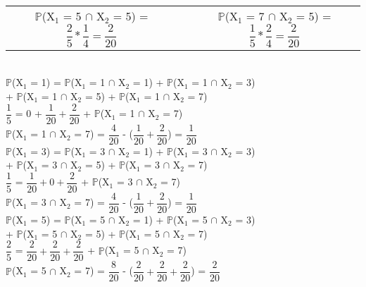 \documentclass[12pt,a4paper,draft,final,oneside]{article}
\begin{document}
\begin{center}
\begin{tabular}{ccc}
			$\mathbb{P}$(X$_{1}$ = 5 $\cap$ X$_{2}$ = 5) = $\dfrac{2}{5}*\dfrac{1}{4} = \dfrac{2}{20}$ & &
			$\mathbb{P}$(X$_{1}$ = 7 $\cap$ X$_{2}$ = 5) = $\dfrac{1}{5}*\dfrac{2}{4} = \dfrac{2}{20}$ \vspace{0.5cm}\\	
		\end{tabular}
		\vspace{1cm}\\
		$\mathbb{P}$(X$_{1}$ = 1) = $\mathbb{P}$(X$_{1}$ = 1 $\cap$ X$_{2}$ = 1) + $\mathbb{P}$(X$_{1}$ = 1 $\cap$ X$_{2}$ = 3)\\
		+ $\mathbb{P}$(X$_{1}$ = 1 $\cap$ X$_{2}$ = 5) + $\mathbb{P}$(X$_{1}$ = 1 $\cap$ X$_{2}$ = 7)
		\vspace{0.25cm}\\
		$\dfrac{1}{5}$ = 0 + $\dfrac{1}{20} + \dfrac{2}{20}$ + $\mathbb{P}$(X$_{1}$ = 1 $\cap$ X$_{2}$ = 7)
		\vspace{0.25cm}\\
		$\mathbb{P}$(X$_{1}$ = 1 $\cap$ X$_{2}$ = 7) = $\dfrac{4}{20}$ - ($\dfrac{1}{20} + \dfrac{2}{20}$) = $\dfrac{1}{20}$
		\vspace{1cm}\\
		$\mathbb{P}$(X$_{1}$ = 3) = $\mathbb{P}$(X$_{1}$ = 3 $\cap$ X$_{2}$ = 1) + $\mathbb{P}$(X$_{1}$ = 3 $\cap$ X$_{2}$ = 3)\\
		+ $\mathbb{P}$(X$_{1}$ = 3 $\cap$ X$_{2}$ = 5) + $\mathbb{P}$(X$_{1}$ = 3 $\cap$ X$_{2}$ = 7)
		\vspace{0.25cm}\\
		$\dfrac{1}{5}$ = $\dfrac{1}{20} + 0 + \dfrac{2}{20}$ + $\mathbb{P}$(X$_{1}$ = 3 $\cap$ X$_{2}$ = 7)
		\vspace{0.25cm}\\
		$\mathbb{P}$(X$_{1}$ = 3 $\cap$ X$_{2}$ = 7) = $\dfrac{4}{20}$ - ($\dfrac{1}{20} + \dfrac{2}{20}$) = $\dfrac{1}{20}$
		\vspace{1cm}\\
		$\mathbb{P}$(X$_{1}$ = 5) = $\mathbb{P}$(X$_{1}$ = 5 $\cap$ X$_{2}$ = 1) + $\mathbb{P}$(X$_{1}$ = 5 $\cap$ X$_{2}$ = 3)\\
		+ $\mathbb{P}$(X$_{1}$ = 5 $\cap$ X$_{2}$ = 5) + $\mathbb{P}$(X$_{1}$ = 5 $\cap$ X$_{2}$ = 7)
		\vspace{0.25cm}\\
		$\dfrac{2}{5}$ = $\dfrac{2}{20} + \dfrac{2}{20} + \dfrac{2}{20}$ + $\mathbb{P}$(X$_{1}$ = 5 $\cap$ X$_{2}$ = 7)
		\vspace{0.25cm}\\
		$\mathbb{P}$(X$_{1}$ = 5 $\cap$ X$_{2}$ = 7) = $\dfrac{8}{20}$ - ($\dfrac{2}{20} + \dfrac{2}{20} + \dfrac{2}{20}$) = $\dfrac{2}{20}$

\end{center}
\end{document}
